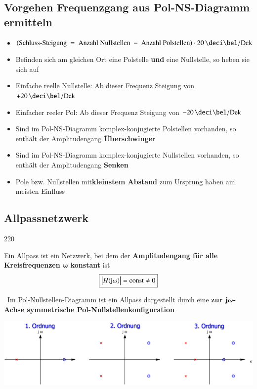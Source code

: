 \subsection{Vorgehen Frequenzgang aus Pol-NS-Diagramm ermitteln}

\begin{itemize}
    \item $(\text{Schluss-Steigung } = \text{ Anzahl Nullstellen } - \text{ Anzahl Polstellen}) \cdot 20 \, \deci \bel / \Dek$
    \item Befinden sich am gleichen Ort eine Polstelle \textbf{und} eine Nullstelle, so heben sie sich auf
    \item Einfache reelle Nullstelle: Ab dieser Frequenz Steigung von  $+20 \, \deci \bel / \Dek$
    \item Einfacher reeler Pol: Ab dieser Frequenz Steigung von  $-20 \, \deci \bel / \Dek$
    \item Sind im Pol-NS-Diagramm komplex-konjugierte Polstellen vorhanden, so enthält der Amplitudengang \textbf{Überschwinger}
    \item Sind im Pol-NS-Diagramm komplex-konjugierte Nullstellen vorhanden, so enthält der Amplitudengang \textbf{Senken}
    \item Pole bzw. Nullstellen mit\textbf{kleinstem Abstand} zum Ursprung haben am meisten Einfluss
\end{itemize}



\subsection{Allpassnetzwerk}{220}

Ein Allpass ist ein Netzwerk, bei dem der \textbf{Amplitudengang für alle Kreisfrequenzen $\bm{\omega}$ konstant} ist
$$ \boxed{\left|H(\mathrm{j} \omega)\right| = \mathrm{const} \neq 0}$$

\textrightarrow\ Im Pol-Nullstellen-Diagramm ist ein Allpass dargestellt durch eine 
\textbf{zur $\bm{\mathrm{j} \omega}$-Achse symmetrische Pol-Nullstellenkonfiguration}

\includegraphics[width=\columnwidth]{images/allpass.png}

